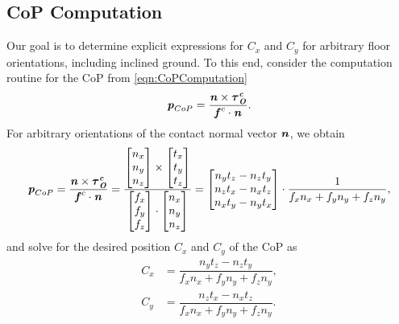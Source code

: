\subsection{CoP Computation}
Our goal is to determine explicit expressions for $C_x$ and $C_y$ for arbitrary floor orientations, including inclined ground. To this end, consider the computation routine for the \gls{CoP} from \cref{eqn:CoPComputation}
\begin{equation*} 
\bm{\mathit{p}}_{CoP}=\dfrac{\bm{\mathit{n}}\times\bm{\mathit{\bm{\mathit{\tau}}_O^c}}}{\bm{\mathit{f}}^c\cdot\bm{\mathit{n}}}.
\end{equation*}
For arbitrary orientations of the contact normal vector $\bm{\mathit{n}}$, we obtain
\begin{equation}\label{eqn:CoPComputationDetailed}
\bm{\mathit{p}}_{CoP}=\dfrac{\bm{\mathit{n}}\times\bm{\mathit{\bm{\mathit{\tau}}_O^c}}}{\bm{\mathit{f}}^c\cdot\bm{\mathit{n}}} = \dfrac{\begin{bmatrix} n_x \\ n_y \\ n_z \end{bmatrix} \times \begin{bmatrix} t_x \\ t_y \\ t_z \end{bmatrix}}{\begin{bmatrix} f_x \\ f_y \\ f_z \end{bmatrix} \cdot \begin{bmatrix} n_x \\ n_y \\ n_z \end{bmatrix}} = 
\begin{bmatrix} n_yt_z - n_zt_y \\ n_zt_x-n_xt_z \\ n_xt_y-n_yt_x \end{bmatrix}\cdot \dfrac{1}{f_xn_x+f_yn_y+f_zn_y},
\end{equation}
and solve for the desired position $C_x$ and $C_y$ of the \gls{CoP} as
\begin{subequations}
\begin{align}
C_x&=\dfrac{n_yt_z - n_zt_y}{f_xn_x+f_yn_y+f_zn_y}, \label{subeqn:Cx}\\
C_y&=\dfrac{n_zt_x-n_xt_z}{f_xn_x+f_yn_y+f_zn_y} \label{subeqn:Cy}.
\end{align}
\end{subequations}

